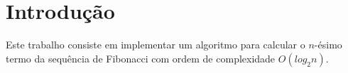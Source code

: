 \section{Introdução}

Este trabalho consiste em implementar um algoritmo para calcular o $n$-ésimo termo da sequência de Fibonacci com ordem de complexidade $O(log_{2}n)$.
